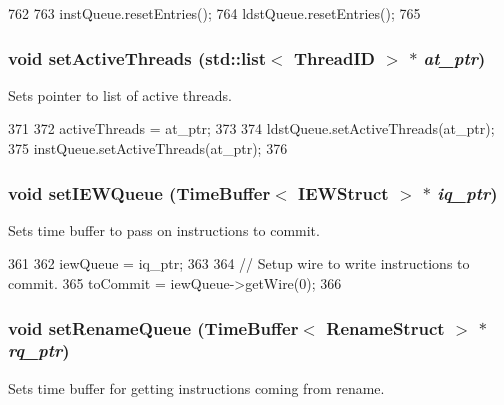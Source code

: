 \begin{DoxyCode}
762 {
763     instQueue.resetEntries();
764     ldstQueue.resetEntries();
765 }
\end{DoxyCode}
\hypertarget{classDefaultIEW_aab96bdacf8bd420402cbb543f994e054}{
\subsubsection[{setActiveThreads}]{\setlength{\rightskip}{0pt plus 5cm}void setActiveThreads ({\bf std::list}$<$ {\bf ThreadID} $>$ $\ast$ {\em at\_\-ptr})}}
\label{classDefaultIEW_aab96bdacf8bd420402cbb543f994e054}
Sets pointer to list of active threads. 


\begin{DoxyCode}
371 {
372     activeThreads = at_ptr;
373 
374     ldstQueue.setActiveThreads(at_ptr);
375     instQueue.setActiveThreads(at_ptr);
376 }
\end{DoxyCode}
\hypertarget{classDefaultIEW_a6b8bf7d75423c9bccd93d50470f7f935}{
\subsubsection[{setIEWQueue}]{\setlength{\rightskip}{0pt plus 5cm}void setIEWQueue ({\bf TimeBuffer}$<$ {\bf IEWStruct} $>$ $\ast$ {\em iq\_\-ptr})}}
\label{classDefaultIEW_a6b8bf7d75423c9bccd93d50470f7f935}
Sets time buffer to pass on instructions to commit. 


\begin{DoxyCode}
361 {
362     iewQueue = iq_ptr;
363 
364     // Setup wire to write instructions to commit.
365     toCommit = iewQueue->getWire(0);
366 }
\end{DoxyCode}
\hypertarget{classDefaultIEW_a701624f92a819fe4205faede6e614d9f}{
\subsubsection[{setRenameQueue}]{\setlength{\rightskip}{0pt plus 5cm}void setRenameQueue ({\bf TimeBuffer}$<$ {\bf RenameStruct} $>$ $\ast$ {\em rq\_\-ptr})}}
\label{classDefaultIEW_a701624f92a819fe4205faede6e614d9f}
Sets time buffer for getting instructions coming from rename. 


